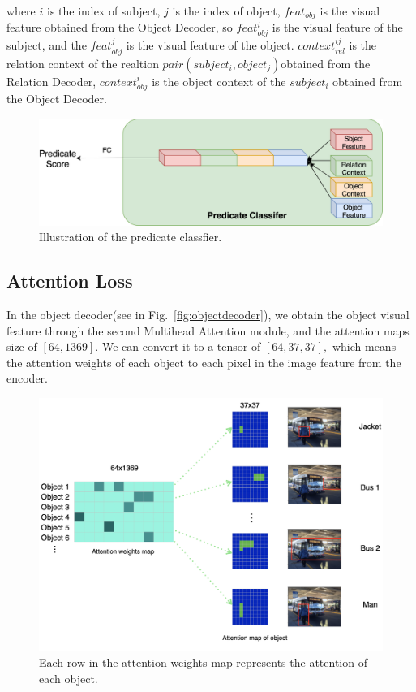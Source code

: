 where $ i $ is the index of subject, $ j $ is the index of object,  $ feat_{obj} $ is the visual feature obtained from the Object Decoder, so $ feat_{obj}^i $ is the visual feature of the subject, and the $ feat_{obj}^j $ is the visual feature of the object. $ context_{rel}^{ij} $ is the relation context of the realtion $ pair(subject_i,object_j)  $obtained from the Relation Decoder, $  context_{obj}^i $ is the object context of the $subject_i$ obtained from the Object Decoder.

 \begin{figure}[tbph!]
 	\centering
 	\includegraphics[width=1\linewidth]{figures/predicate_classifer}
 	\caption[Illustration of the predicate classfier]{Illustration of the predicate classfier.}
 	\label{fig:predicateclassifer}
 \end{figure}
 

\subsection{Attention Loss}

In the object decoder(see in Fig.~\ref{fig:objectdecoder}), we obtain the object visual feature through the second Multihead Attention module, and the attention maps size of $ [64, 1369] $. We can convert it to a tensor of $ [64, 37, 37], $ which means the attention weights of each object to each pixel in the image feature from the encoder.


\begin{figure}[h!]
	\centering
	\includegraphics[width=1\linewidth]{figures/attention_map}
	\caption[Illustration of the attention map]{Each row in the attention weights map represents the attention of each object. }
	\label{fig:attentionmap}
\end{figure}

